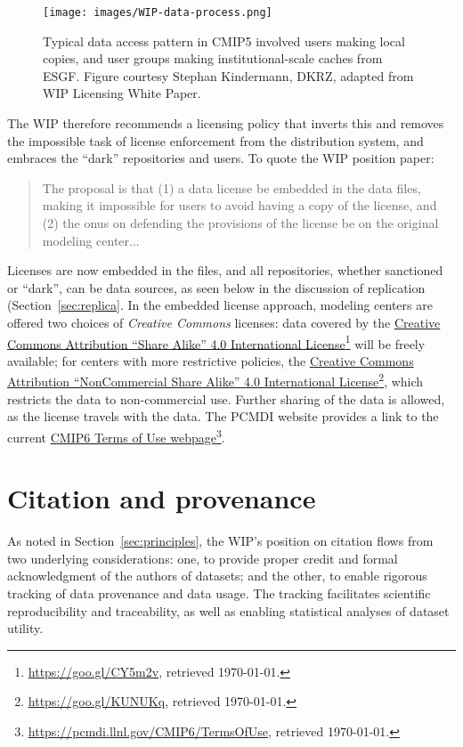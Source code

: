 \documentclass[gmd,manuscript]{copernicus}
\newcommand{\pllabel}[1]{\label{p-#1}\linelabel{l-#1}}
\newcommand{\urlref}[2] {\href{#1}{#2}\footnote{\url{#1}, retrieved \today.}}
\begin{document}
\begin{figure*}
  \begin{center}
    \texttt{[image: images/WIP-data-process.png]}
  \end{center}
  \caption{Typical data access pattern in CMIP5 involved users making
    local copies, and user groups making institutional-scale caches
    from ESGF. Figure courtesy Stephan Kindermann, DKRZ, adapted from
    WIP Licensing White Paper.}
  \label{fig:dark}
\end{figure*}

The WIP therefore recommends a licensing policy that inverts this and
removes the impossible task of license enforcement from the distribution 
system, and embraces the ``dark'' repositories and users.
To quote the WIP position paper:

\begin{quote}
  The proposal is that (1) a data license be embedded in the data
  files, making it impossible for users to avoid having a copy of the
  license, and (2) the onus on defending the provisions of the license
  be on the original modeling center...
\end{quote}

\pllabel{RC2-27}
Licenses are now embedded in the files, and all repositories, whether
sanctioned or ``dark'', can be data sources, as seen below in the
discussion of replication (Section~\ref{sec:replica}.
\pllabel{RC2-30}
In the embedded license approach, modeling centers are offered two
choices of \emph{Creative Commons} licenses: data covered by the
\urlref{https://goo.gl/CY5m2v}{Creative Commons Attribution ``Share
  Alike'' 4.0 International License} will be freely available; for
centers with more restrictive policies, the
\urlref{https://goo.gl/KUNUKq}{Creative Commons Attribution
  ``NonCommercial Share Alike'' 4.0 International License}, which
restricts the data to non-commercial use. Further sharing of the data
is allowed, as the license travels with the data. The PCMDI website
provides a link to the current
\urlref{https://pcmdi.llnl.gov/CMIP6/TermsOfUse}{CMIP6 Terms of Use
  webpage}.

\section{Citation and provenance}
\label{sec:cite}

As noted in Section~\ref{sec:principles}, the WIP's position on
citation flows from two underlying considerations: one, to provide
proper credit and formal acknowledgment of the authors of datasets;
and the other, to enable rigorous tracking of data provenance and data
usage. The tracking facilitates scientific reproducibility and
traceability, as well as enabling statistical analyses of dataset
utility.
\end{document}
